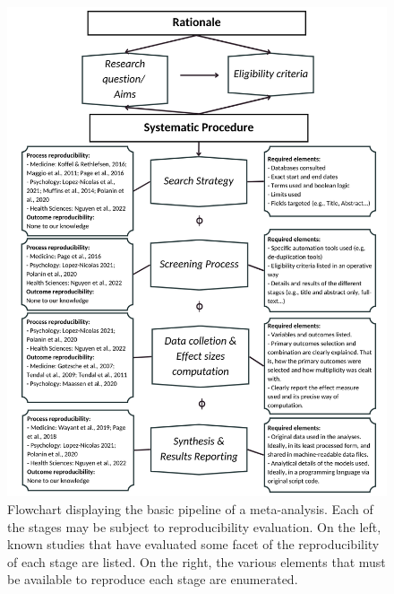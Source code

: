 \documentclass[
  ,apa7,floatsintext]{apa6}
\begin{document}
\begin{figure}
\begin{center}
\includegraphics[width=\textwidth, height=\textheight]{results/Figure 1.png}

\caption{Flowchart displaying the basic pipeline of a meta-analysis. Each of the stages may be subject to reproducibility evaluation. On the left, known studies that have evaluated some facet of the reproducibility of each stage are listed. On the right, the various elements that must be available to reproduce each stage are enumerated.
}

\label{fig:figs1}
\end{center}
\end{figure}
\end{document}

